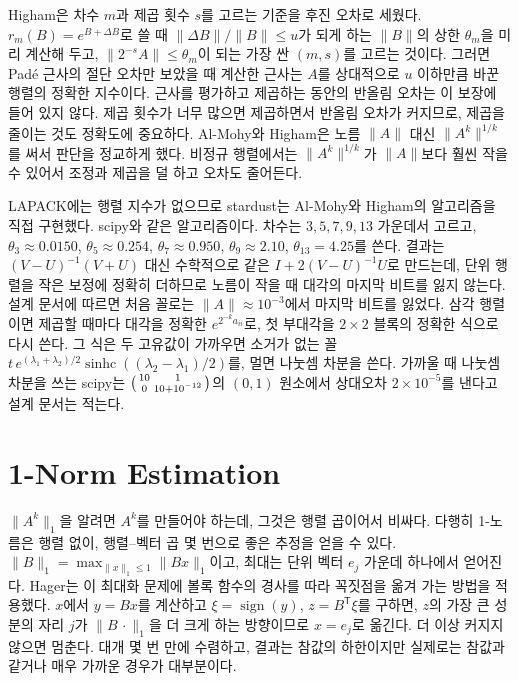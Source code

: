 Higham은 차수 $m$과 제곱 횟수 $s$를 고르는 기준을 후진 오차로 세웠다. $r_m(B)=e^{B+\Delta B}$로 쓸 때 $\|\Delta B\|/\|B\|\le u$가 되게 하는 $\|B\|$의 상한 $\theta_m$을 미리 계산해 두고, $\|2^{-s}A\|\le\theta_m$이 되는 가장 싼 $(m,s)$를 고르는 것이다\cite{higham2005expm}. 그러면 Padé 근사의 절단 오차만 보았을 때 계산한 근사는 $A$를 상대적으로 $u$ 이하만큼 바꾼 행렬의 정확한 지수이다. 근사를 평가하고 제곱하는 동안의 반올림 오차는 이 보장에 들어 있지 않다. 제곱 횟수가 너무 많으면 제곱하면서 반올림 오차가 커지므로, 제곱을 줄이는 것도 정확도에 중요하다. Al-Mohy와 Higham은 노름 $\|A\|$ 대신 $\|A^k\|^{1/k}$를 써서 판단을 정교하게 했다\cite{almohy2009expm}. 비정규 행렬에서는 $\|A^k\|^{1/k}$가 $\|A\|$보다 훨씬 작을 수 있어서 조정과 제곱을 덜 하고 오차도 줄어든다.

\begin{instardust}
LAPACK에는 행렬 지수가 없으므로 stardust는 Al-Mohy와 Higham의 알고리즘을 직접 구현했다. scipy와 같은 알고리즘이다. 차수는 $3,5,7,9,13$ 가운데서 고르고, $\theta_3\approx0.0150$, $\theta_5\approx0.254$, $\theta_7\approx0.950$, $\theta_9\approx2.10$, $\theta_{13}=4.25$를 쓴다. 결과는 $(V-U)^{-1}(V+U)$ 대신 수학적으로 같은 $I+2(V-U)^{-1}U$로 만드는데, 단위 행렬을 작은 보정에 정확히 더하므로 노름이 작을 때 대각의 마지막 비트를 잃지 않는다. 설계 문서에 따르면 처음 꼴로는 $\|A\|\approx10^{-3}$에서 마지막 비트를 잃었다. 삼각 행렬이면 제곱할 때마다 대각을 정확한 $e^{2^{-k}a_{ii}}$로, 첫 부대각을 $2\times2$ 블록의 정확한 식으로 다시 쓴다. 그 식은 두 고유값이 가까우면 소거가 없는 꼴 $t\,e^{(\lambda_1+\lambda_2)/2}\operatorname{sinhc}((\lambda_2-\lambda_1)/2)$를, 멀면 나눗셈 차분을 쓴다. 가까울 때 나눗셈 차분을 쓰는 scipy는 $\begin{psmallmatrix}10&1\\0&10+10^{-12}\end{psmallmatrix}$의 $(0,1)$ 원소에서 상대오차 $2\times10^{-5}$를 낸다고 설계 문서는 적는다.
\end{instardust}

\section{1-Norm Estimation}
\label{sec:norm-estimation}

$\|A^k\|_1$을 알려면 $A^k$를 만들어야 하는데, 그것은 행렬 곱이어서 비싸다. 다행히 1-노름은 행렬 없이, 행렬--벡터 곱 몇 번으로 좋은 추정을 얻을 수 있다. $\|B\|_1=\max_{\|x\|_1\le1}\|Bx\|_1$이고, 최대는 단위 벡터 $e_j$ 가운데 하나에서 얻어진다. Hager는 이 최대화 문제에 볼록 함수의 경사를 따라 꼭짓점을 옮겨 가는 방법을 적용했다\cite{hager1984}. $x$에서 $y=Bx$를 계산하고 $\xi=\operatorname{sign}(y)$, $z=B^{\mathsf T}\xi$를 구하면, $z$의 가장 큰 성분의 자리 $j$가 $\|B\,\cdot\|_1$을 더 크게 하는 방향이므로 $x=e_j$로 옮긴다. 더 이상 커지지 않으면 멈춘다. 대개 몇 번 만에 수렴하고, 결과는 참값의 하한이지만 실제로는 참값과 같거나 매우 가까운 경우가 대부분이다.

